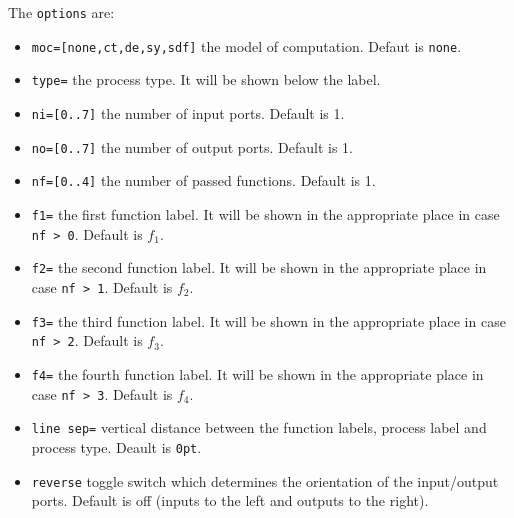 \documentclass[10pt]{article}
\begin{document}
The \texttt{options} are:
\begin{itemize}
\item \texttt{moc=[none,ct,de,sy,sdf]} the model of computation. Defaut is \texttt{none}.
\item \texttt{type=} the process type. It will be shown below the label.
\item \texttt{ni=[0..7]} the number of input ports. Default is 1.
\item \texttt{no=[0..7]} the number of output ports. Default is 1.
\item \texttt{nf=[0..4]} the number of passed functions. Default is 1.
\item \texttt{f1=} the first function label. It will be shown in the appropriate place in case \texttt{nf > 0}. Default is $f_1$.
\item \texttt{f2=} the second function label. It will be shown in the appropriate place in case \texttt{nf > 1}. Default is $f_2$.
\item \texttt{f3=} the third function label. It will be shown in the appropriate place in case \texttt{nf > 2}. Default is $f_3$.
\item \texttt{f4=} the fourth function label. It will be shown in the appropriate place in case \texttt{nf > 3}. Default is $f_4$.
\item\texttt{line sep=} vertical distance between the function labels, process label and process type. Deault is \texttt{0pt}.
\item\texttt{reverse} toggle switch which determines the orientation of the input/output ports. Default is off (inputs to the left and outputs to the right).

\end{itemize}
\end{document}
